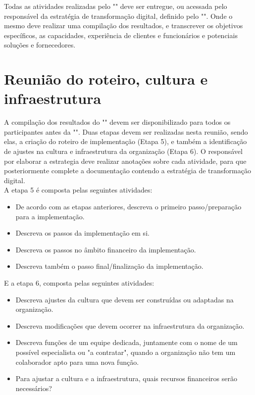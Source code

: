 Todas as atividades realizadas pelo "" deve ser entregue, ou acessada pelo responsável da estratégia de transformação digital, definido pelo "". Onde o mesmo deve realizar uma compilação dos resultados, e transcrever os objetivos específicos, as capacidades, experiência de clientes e funcionários e potenciais soluções e fornecedores.

\section{Reunião do roteiro, cultura e infraestrutura}\label{sec:reuniaoRoteiroCulturaInfraestrutura}

A compilação dos resultados do "" devem ser disponibilizado para todos os participantes antes da "". Duas etapas devem ser realizadas nesta reunião, sendo elas, a criação do roteiro de implementação (Etapa 5), e também a identificação de ajustes na cultura e infraestrutura da organização (Etapa 6). O responsável por elaborar a estrategia deve realizar anotações sobre cada atividade, para que posteriormente complete a documentação contendo a estratégia de transformação digital.\\

A etapa 5 é composta pelas seguintes atividades:
\begin{itemize}
    \item De acordo com as etapas anteriores, descreva o primeiro passo/preparação para a implementação.
    
    \item Descreva os passos da implementação em si.
    
    \item Descreva os passos no âmbito financeiro da implementação.
    
    \item Descreva também o passo final/finalização da implementação.\\
\end{itemize}

E a etapa 6, composta pelas seguintes atividades:
\begin{itemize}
    \item Descreva ajustes da cultura que devem ser construídas ou adaptadas na organização.
    
    \item Descreva modificações que devem ocorrer na infraestrutura da organização.
    
    \item Descreva funções de um equipe dedicada, juntamente com o nome de um possível especialista ou "a contratar", quando a organização não tem um colaborador apto para uma nova função.
    
    \item Para ajustar a cultura e a infraestrutura, quais recursos financeiros serão necessários?
\end{itemize}



